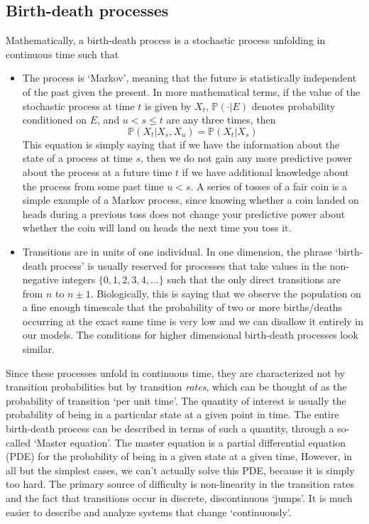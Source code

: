 \subsection{Birth-death processes}
Mathematically, a birth-death process is a stochastic process unfolding in continuous time such that
\begin{itemize}
	\item The process is `Markov', meaning that the future is statistically independent of the past given the present. In more mathematical terms, if the value of the stochastic process at time $t$ is given by $X_t$, $\mathbb{P}(\cdot | E)$ denotes probability conditioned on $E$, and $u < s \leq t$ are any three times, then
	\begin{equation*}
	\mathbb{P}(X_t | X_s, X_u) = \mathbb{P}(X_t | X_s)
	\end{equation*}
	This equation is simply saying that if we have the information about the state of a process at time $s$, then we do not gain any more predictive power about the process at a future time $t$ if we have additional knowledge about the process from some past time $u < s$. A series of tosses of a fair coin is a simple example of a Markov process, since knowing whether a coin landed on heads during a previous toss does not change your predictive power about whether the coin will land on heads the next time you toss it.
	\item Transitions are in units of one individual. In one dimension, the phrase `birth-death process' is usually reserved for processes that take values in the non-negative integers $\{0,1,2,3,4,\ldots\}$ such that the only direct transitions are from $n$ to $n \pm 1$. Biologically, this is saying that we observe the population on a fine enough timescale that the probability of two or more births/deaths occurring at the exact same time is very low and we can disallow it entirely in our models. The conditions for higher dimensional birth-death processes look similar.
\end{itemize}
Since these processes unfold in continuous time, they are characterized not by transition probabilities but by transition \emph{rates}, which can be thought of as the probability of transition `per unit time'. The quantity of interest is usually the probability of being in a particular state at a given point in time. The entire birth-death process can be described in terms of such a quantity, through a so-called `Master equation'. The master equation is a partial differential equation (PDE) for the probability of being in a given state at a given time, However, in all but the simplest cases, we can't actually solve this PDE, because it is simply too hard. The primary source of difficulty is non-linearity in the transition rates and the fact that transitions occur in discrete, discontinuous `jumps'. It is much easier to describe and analyze systems that change `continuously'.

